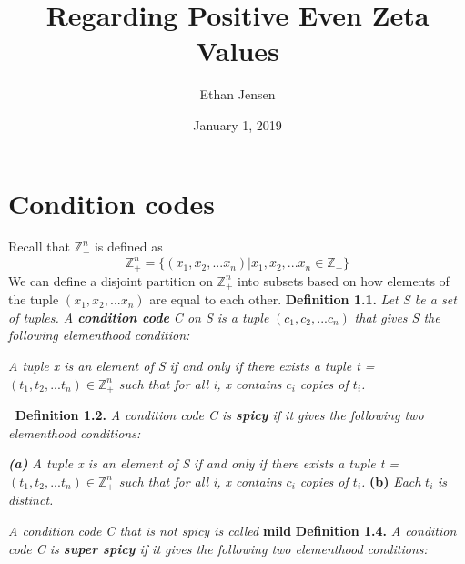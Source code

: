 \documentclass[12pt]{article}
\title{Regarding Positive Even Zeta Values}
\author{Ethan Jensen}
\date{January 1, 2019}
\begin{document}
	\maketitle
\section{Condition codes}
\noindent
Recall that \(\mathbb{Z}_+^n\) is defined as
\[\mathbb{Z}_+^n=\{(x_1,x_2,...x_n)|x_1,x_2,...x_n\in\mathbb{Z}_+\}\]
We can define a disjoint partition on \(\mathbb{Z}_+^n\) into subsets based on how elements of the tuple \((x_1,x_2,...x_n)\) are equal to each other.
\newline \newline
\textbf{Definition 1.1.} \textit{Let S be a set of tuples. A \textbf{condition code} C on S is a tuple} \((c_1, c_2,...c_n)\) \textit{that gives S the following elementhood condition:} \newline
\begin{adjustwidth}{2.5em}{0pt}
	\textit{A tuple x is an element of S if and only if there exists a tuple t = \((t_1,t_2,...t_n) \in \mathbb{Z}_+^n\) such that for all i, x contains \(c_i\) copies of \(t_i\).}
\end{adjustwidth}
\(\ \)
\newline
\textbf{Definition 1.2.} \textit{A condition code C is \textbf{spicy} if it gives the following two elementhood conditions:}
\begin{adjustwidth}{2.5em}{0pt}
	\textit{\textbf{(a)} A tuple x is an element of S if and only if there exists a tuple t = \((t_1,t_2,...t_n) \in \mathbb{Z}_+^n\) such that for all i, x contains \(c_i\) copies of \(t_i\).}
	\newline
	\newline
 \textbf{(b) } \textit{Each }\(t_i\)\textit{ is distinct.}
\end{adjustwidth}
\textit{A condition code C that is not spicy is called }\textbf{mild}
\newline
\newline
\textbf{Definition 1.4.} \textit{A condition code C is \textbf{super spicy} if it gives the following two elementhood conditions:}
\end{document}
